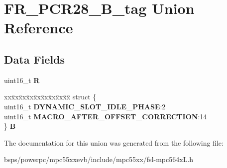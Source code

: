 \hypertarget{unionFR__PCR28__16B__tag}{}\section{F\+R\+\_\+\+P\+C\+R28\+\_\+B\+\_\+tag Union Reference}
\label{unionFR__PCR28__16B__tag}
\subsection*{Data Fields}
\begin{DoxyCompactItemize}
\item 
\mbox{\label{unionFR__PCR28__16B__tag_ab2917b390cc627c36714c1ae4445df28}} 
uint16\+\_\+t {\bfseries R}
\item 
\mbox{\label{unionFR__PCR28__16B__tag_a4904061514977afbaeb9aade3e7b433a}} 
\begin{tabbing}
xx\=xx\=xx\=xx\=xx\=xx\=xx\=xx\=xx\=\kill
struct \{\\
\>uint16\_t {\bfseries DYNAMIC\_SLOT\_IDLE\_PHASE}:2\\
\>uint16\_t {\bfseries MACRO\_AFTER\_OFFSET\_CORRECTION}:14\\
\} {\bfseries B}\\

\end{tabbing}\end{DoxyCompactItemize}


The documentation for this union was generated from the following file\+:\begin{DoxyCompactItemize}
\item 
bsps/powerpc/mpc55xxevb/include/mpc55xx/fsl-\/mpc564x\+L.\+h\end{DoxyCompactItemize}
